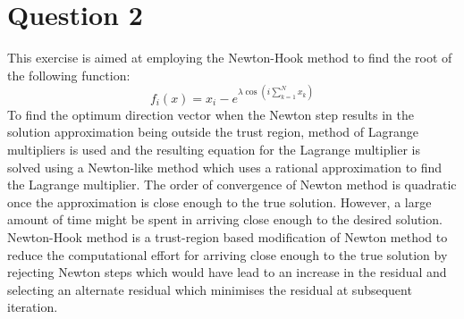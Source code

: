 \documentclass[11pt, oneside]{article}
\begin{document}
\section*{Question 2}
This exercise is aimed at employing the Newton-Hook method to find the root of the following function:
\begin{equation}\label{eq:rootfunc}
  f_i(x) = x_i - e^{\lambda \cos(i \sum_{k=1}^{N} x_k)}
\end{equation}
To find the optimum direction vector when the Newton step results in the solution approximation being outside the trust region, method of Lagrange multipliers is used and the resulting equation for the Lagrange multiplier is solved using a Newton-like method which uses a rational approximation to find the Lagrange multiplier. The order of convergence of Newton method is quadratic once the approximation is close enough to the true solution. However, a large amount of time might be spent in arriving close enough to the desired solution. Newton-Hook method is a trust-region based modification of Newton method to reduce the computational effort for arriving close enough to the true solution by rejecting Newton steps which would have lead to an increase in the residual and selecting an alternate residual which minimises the residual at subsequent iteration.
\end{document}
